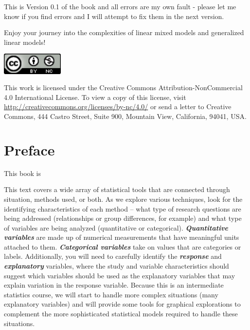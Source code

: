 \documentclass[
]{book}
\begin{document}
This is Version 0.1 of the book and all errors are my own fault - please let me know if you find errors and I will attempt to fix them in the next version.

Enjoy your journey into the complexities of linear mixed models and generalized linear models!

\begin{center}\includegraphics[width=1.22in]{frontMatter/creative_commons_license} \end{center}

This work is licensed under the Creative Commons Attribution-NonCommercial 4.0 International License. To view a copy of this license, visit \url{http://creativecommons.org/licenses/by-nc/4.0/} or send a letter to Creative Commons, 444 Castro Street, Suite 900, Mountain View, California, 94041, USA.

\mainmatter

\hypertarget{chapter1}{%
\chapter{Preface}\label{chapter1}}

This book is

\indent This text covers a wide array of statistical tools that are connected through situation, methods used,
or both. As we explore various techniques, look for the identifying characteristics
of each method -- what type of research questions are being addressed
(relationships or group differences, for example) and what type of variables
are being analyzed (quantitative or categorical). \textbf{\emph{Quantitative variables}}  are made up of numerical measurements that have meaningful units attached to
them. \textbf{\emph{Categorical variables}}  take on values that are categories or labels.
Additionally, you will need to carefully identify the \textbf{\emph{response}}  and \textbf{\emph{explanatory}}  variables, where
the study and variable characteristics should suggest which variables should be used
as the explanatory variables that may explain
variation in the response variable. Because this is an intermediate statistics
course, we will start to handle more complex situations (many explanatory
variables) and will provide some tools for graphical explorations to complement
the more sophisticated statistical models required to handle these situations.
\end{document}
